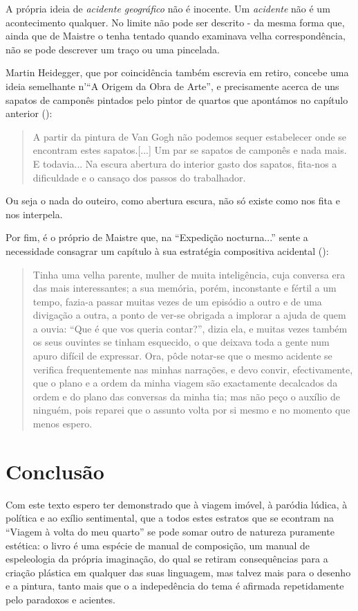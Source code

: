 \documentclass[12pt]{article}
\begin{document}
  A própria ideia de \emph{acidente geográfico} não é inocente. Um \emph{acidente} não é um acontecimento qualquer. No limite não pode ser descrito - da mesma forma que, ainda que de Maistre o tenha tentado quando examinava velha correspondência, não se pode descrever um traço ou uma pincelada. 

Martin Heidegger, que por coincidência também escrevia em retiro, concebe uma ideia semelhante n'``A Origem da Obra de Arte'', e precisamente acerca de uns sapatos de camponês pintados pelo pintor de quartos que apontámos no capítulo anterior (\cite[p.xxx?]{heidegger}): 

\begin{quote}
  A partir da pintura de Van Gogh não podemos sequer estabelecer onde se encontram estes sapatos.[...] Um par se sapatos de camponês e nada mais. E todavia...
  Na escura abertura do interior gasto dos sapatos, fita-nos a dificuldade e o cansaço dos passos do trabalhador.
\end{quote} 

Ou seja o nada do outeiro, como abertura escura, não só existe como nos fita e nos interpela.

Por fim, é o próprio de Maistre que, na ``Expedição nocturna...'' sente a necessidade consagrar um capítulo à sua estratégia compositiva acidental (\cite[p.xxx?]{demaistre}):

\begin{quote}
  Tinha uma velha parente, mulher de muita inteligência, cuja conversa era das mais interessantes; a sua memória, porém, inconstante e fértil a um tempo, fazia-a passar muitas vezes de um episódio a outro e de uma divigação a outra, a ponto de ver-se obrigada a implorar a ajuda de quem a ouvia: ``Que é que vos queria contar?'', dizia ela, e muitas vezes também os seus ouvintes se tinham esquecido, o que deixava toda a gente num apuro difícil de expressar. Ora, pôde notar-se que o mesmo acidente se verifica frequentemente nas minhas narrações, e devo convir, efectivamente, que o plano e a ordem da minha viagem são exactamente decalcados da ordem e do plano das conversas da minha tia; mas não peço o auxílio de ninguém, pois reparei que o assunto volta por si mesmo e no momento que menos espero.
\end{quote}

\section{Conclusão}

Com este texto espero ter demonstrado que à viagem imóvel, à paródia lúdica, à política e ao exílio sentimental, que a todos estes estratos que se econtram na ``Viagem à volta do meu quarto'' se pode somar outro de natureza puramente estética: o livro é uma espécie de manual de composição, um manual de espeleologia da própria imaginação, do qual se retiram consequências para a criação plástica em qualquer das suas linguagem, mas talvez mais para o desenho e a pintura, tanto mais que o a indepedência do tema é afirmada repetidamente pelo paradoxos e acientes.
\end{document}
